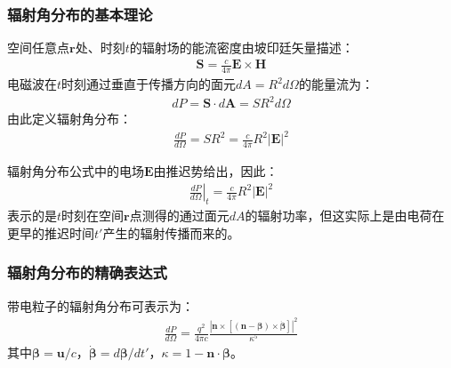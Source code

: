 
\subsubsection{辐射角分布的基本理论}

\begin{definition}[坡印廷矢量与辐射流量]
空间任意点$\mathbf{r}$处、时刻$t$的辐射场的能流密度由坡印廷矢量描述：
\begin{align}
\mathbf{S} = \frac{c}{4\pi}\mathbf{E} \times \mathbf{H}
\end{align}
电磁波在$t$时刻通过垂直于传播方向的面元$dA = R^2d\Omega$的能量流为：
\begin{align}
dP = \mathbf{S} \cdot d\mathbf{A} = S R^2 d\Omega
\end{align}
由此定义辐射角分布：
\begin{align}
\frac{dP}{d\Omega} = S R^2 = \frac{c}{4\pi} R^2|\mathbf{E}|^2
\end{align}
\end{definition}


\begin{derivationnote}[推迟时间的物理意义]
辐射角分布公式中的电场$\mathbf{E}$由推迟势给出，因此：
\begin{align}
\left.\frac{dP}{d\Omega}\right|_t = \frac{c}{4\pi} R^2|\mathbf{E}|^2
\end{align}
表示的是$t$时刻在空间$\mathbf{r}$点测得的通过面元$dA$的辐射功率，但这实际上是由电荷在更早的推迟时间$t'$产生的辐射传播而来的。
\end{derivationnote}

\subsubsection{辐射角分布的精确表达式}

\begin{theorem}[辐射角分布的一般表达式]
带电粒子的辐射角分布可表示为：
\begin{align}
\frac{dP}{d\Omega} = \frac{q^2}{4\pi c} \frac{\left|\mathbf{n} \times [(\mathbf{n}-\boldsymbol{\beta}) \times \dot{\boldsymbol{\beta}}]\right|^2}{\kappa^5}
\end{align}
其中$\boldsymbol{\beta} = \mathbf{u}/c$，$\dot{\boldsymbol{\beta}} = d\boldsymbol{\beta}/dt'$，$\kappa = 1 - \mathbf{n} \cdot \boldsymbol{\beta}$。
\end{theorem}

